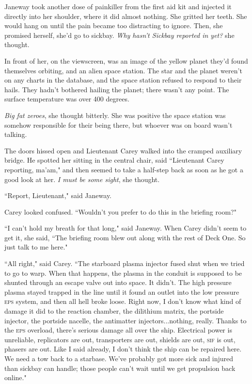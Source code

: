 \documentclass[twoside,letterpaper,12pt]{memoir}
\begin{document}
Janeway took another dose of painkiller from the first aid kit and injected it directly into her shoulder, where it did almost nothing. She gritted her teeth. She would hang on until the pain became too distracting to ignore. Then, she promised herself, she'd go to sickbay. \textit{Why hasn't Sickbay reported in yet?} she thought.

In front of her, on the viewscreen, was an image of the yellow planet they'd found themselves orbiting, and an alien space station. The star and the planet weren't on any charts in the database, and the space station refused to respond to their hails. They hadn't bothered hailing the planet; there wasn't any point. The surface temperature was over 400 degrees.

\textit{Big fat zeroes}, she thought bitterly. She was positive the space station was somehow responsible for their being there, but whoever was on board wasn't talking.

The doors hissed open and Lieutenant Carey walked into the cramped auxiliary bridge. He spotted her sitting in the central chair, said ``Lieutenant Carey reporting, ma'am," and then seemed to take a half-step back as soon as he got a good look at her. \textit{I must be some sight}, she thought.

``Report, Lieutenant," said Janeway.

Carey looked confused. ``Wouldn't you prefer to do this in the briefing room?"

``I can't hold my breath for that long," said Janeway. When Carey didn't seem to get it, she said, ``The briefing room blew out along with the rest of Deck One. So just talk to me here."

``All right," said Carey. ``The starboard plasma injector fused shut when we tried to go to warp. When that happens, the plasma in the conduit is supposed to be shunted through an escape valve out into space. It didn't. The high pressure plasma stayed trapped in the line until it found an outlet into the low pressure \textsc{eps} system, and then all hell broke loose. Right now, I don't know what kind of damage it did to the reaction chamber, the dilithium matrix, the portside injector, the portside nacelle, the antimatter injectors...nothing, really. Thanks to the \textsc{eps} overload, there's serious damage all over the ship. Electrical power is unreliable, replicators are out, transporters are out, shields are out, \textsc{sif} is out, phasers are out. Like I said already, I don't think the ship can be repaired here. We need a tow back to a starbase. We've probably got more sick and injured than sickbay can handle; those people can't wait until we get propulsion back online."
\end{document}
